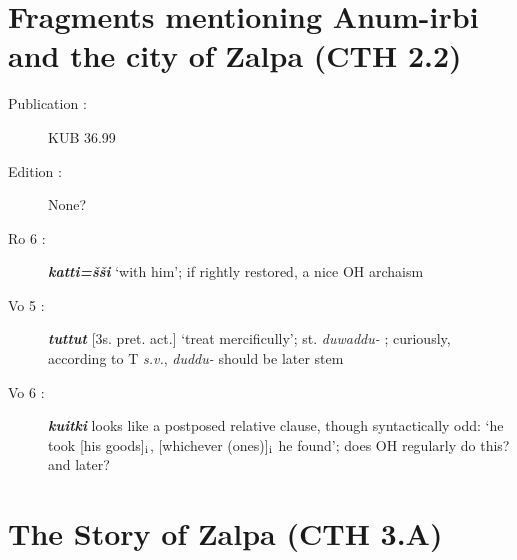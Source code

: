 \documentclass[10pt]{article}
\newcommand{\subsc}[1]{$_{\textrm{\scriptsize{#1}}}$}	%
\newcommand{\p}[1]{{\tiny[{#1}]}}					%
\newcommand{\Hith}{\textsubwedge{H}}
\renewcommand{\.}[1]{\textsubdot{#1}}
\begin{document}
\section{Fragments mentioning Anum-{\Hith}irbi and the city of Zalpa (CTH 2.2)}

\begin{description}

\item[Publication :] KUB 36.99
\item[Edition :] None? 

\item[Ro 6 :] \textbf{\textit{katti=\v{s}\v{s}i}} `with him'; if rightly restored, a nice OH archaism

\item[Vo 5 :] \textbf{\textit{tuttut}} \p{3s. pret. act.} `treat mercificully'; st. \textit{duwaddu-} ; curiously, according to T \textit{s.v.}, \textit{duddu-} should be later stem

\item[Vo 6 :] \textbf{\textit{kuitki}} looks like a postposed relative clause, though syntactically odd: `he took [his goods]\subsc{i}, [whichever (ones)]\subsc{i} he found'; does OH regularly do this? and later?

\end{description}


\section{The Story of Zalpa (CTH 3.A)}
\end{document}
